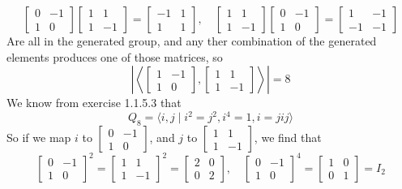 \documentclass[12pt]{article}
\begin{document}
    \[ \begin{bmatrix} 0 & -1 \\ 1 & 0 \end{bmatrix}
    \begin{bmatrix} 1 & 1 \\ 1 & -1 \end{bmatrix}
    = \begin{bmatrix} -1 & 1 \\ 1 & 1 \end{bmatrix}, \quad
    \begin{bmatrix} 1 & 1 \\ 1 & -1 \end{bmatrix}
    \begin{bmatrix} 0 & -1 \\ 1 & 0 \end{bmatrix}
    = \begin{bmatrix} 1 & -1 \\ -1 & -1 \end{bmatrix} \]
    Are all in the generated group,
    and any ther combination of the generated elements
    produces one of those matrices,
    so 
    \[ \left| \left\langle \begin{bmatrix} 1 & -1 \\ 1 & 0 \end{bmatrix},
    \begin{bmatrix} 1 & 1 \\ 1 & -1 \end{bmatrix} \right\rangle \right|
    = 8 \]
    We know from exercise 1.1.5.3 that
    \[ Q_8 = \langle i, j \mid i^2 = j^2, i^4 = 1, i = jij \rangle \]
    So if we map $i$ to $\begin{bmatrix} 0 & -1 \\ 1 & 0 \end{bmatrix}$,
    and $j$ to $\begin{bmatrix} 1 & 1 \\ 1 & -1 \end{bmatrix}$,
    we find that
    \[ \begin{bmatrix} 0 & -1 \\ 1 & 0 \end{bmatrix}^2
    = \begin{bmatrix} 1 & 1 \\ 1 & -1 \end{bmatrix}^2
    = \begin{bmatrix} 2 & 0 \\ 0 & 2 \end{bmatrix}, \quad
    \begin{bmatrix} 0 & -1 \\ 1 & 0 \end{bmatrix}^4
    = \begin{bmatrix} 1 & 0 \\ 0 & 1 \end{bmatrix} = I_2 \]
\end{document}

